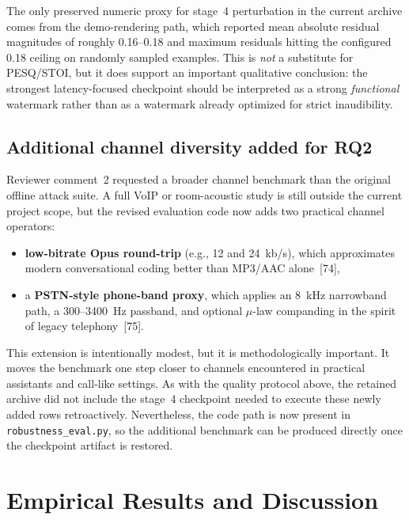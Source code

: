 The only preserved numeric proxy for stage~4 perturbation in the current archive comes from the demo-rendering path, which reported mean absolute residual magnitudes of roughly 0.16--0.18 and maximum residuals hitting the configured 0.18 ceiling on randomly sampled examples. This is \emph{not} a substitute for PESQ/STOI, but it does support an important qualitative conclusion: the strongest latency-focused checkpoint should be interpreted as a strong \emph{functional} watermark rather than as a watermark already optimized for strict inaudibility.

\subsection{Additional channel diversity added for RQ2}
Reviewer comment~2 requested a broader channel benchmark than the original offline attack suite. A full VoIP or room-acoustic study is still outside the current project scope, but the revised evaluation code now adds two practical channel operators:
\begin{itemize}[leftmargin=1.25em]
  \item \textbf{low-bitrate Opus round-trip} (e.g., 12 and 24~kb/s), which approximates modern conversational coding better than MP3/AAC alone~[74],
  \item a \textbf{PSTN-style phone-band proxy}, which applies an 8~kHz narrowband path, a 300--3400~Hz passband, and optional $\mu$-law companding in the spirit of legacy telephony~[75].
\end{itemize}
This extension is intentionally modest, but it is methodologically important. It moves the benchmark one step closer to channels encountered in practical assistants and call-like settings. As with the quality protocol above, the retained archive did not include the stage~4 checkpoint needed to execute these newly added rows retroactively. Nevertheless, the code path is now present in \texttt{robustness\_eval.py}, so the additional benchmark can be produced directly once the checkpoint artifact is restored.

\section{Empirical Results and Discussion}
